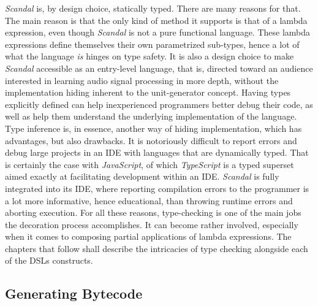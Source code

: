 \emph{Scandal} is, by design choice, statically typed. There are many reasons for that. The main reason is that the only kind of method it supports is that of a lambda expression, even though \emph{Scandal} is not a pure functional language. These lambda expressions define themselves their own parametrized sub-types, hence a lot of what the language \emph{is} hinges on type safety. It is also a design choice to make \emph{Scandal} accessible as an entry-level language, that is, directed toward an audience interested in learning audio signal processing in more depth, without the implementation hiding inherent to the unit-generator concept. Having types explicitly defined can help inexperienced programmers better debug their code, as well as help them understand the underlying implementation of the language. Type inference is, in essence, another way of hiding implementation, which has advantages, but also drawbacks. It is notoriously difficult to report errors and debug large projects in an IDE with languages that are dynamically typed. That is certainly the case with \emph{JavaScript}, of which \emph{TypeScript} is a typed superset aimed exactly at facilitating development within an IDE. \emph{Scandal} is fully integrated into its IDE, where reporting compilation errors to the programmer is a lot more informative, hence educational, than throwing runtime errors and aborting execution. For all these reasons, type-checking is one of the main jobs the decoration process accomplishes. It can become rather involved, especially when it comes to composing partial applications of lambda expressions. The chapters that follow shall describe the intricacies of type checking alongside each of the DSLs constructs.

\subsection{Generating Bytecode}

